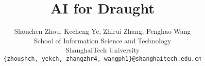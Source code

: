 \documentclass[letterpaper]{article}
\begin{document}
%
\title{AI for Draught}
\author{Shouchen Zhou, Kecheng Ye, Zhirui Zhang, Penghao Wang\\
School of Information Science and Technology\\
ShanghaiTech University\\
{\tt\small \{zhoushch, yekch, zhangzhr4, wangph1\}@shanghaitech.edu.cn}\\
}
\maketitle





\end{document}
